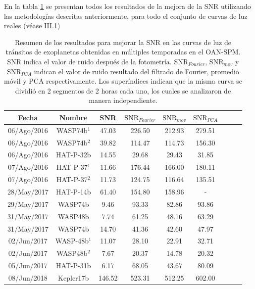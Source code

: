 En la tabla \ref{tab_resultados_obs} se presentan todos los resultados de la mejora de la SNR utilizando las metodologías descritas anteriormente, para todo el conjunto de curvas de luz reales (véase III.1)

\begin{table}
	\centering
	\begin{footnotesize}
	\begin{tabular}{ccccccccc}
	\hline 
	Fecha & Nombre & SNR & $\mbox{SNR}_{Fourier}$ &  $\mbox{SNR}_{mov}$ & $\mbox{SNR}_{PCA}$\\ 
	\hline
	06/Ago/2016 & WASP74b$^{1}$ & 47.03 & 226.50 & 212.93 & 279.51 \\ 
	06/Ago/2016 & WASP74b$^{2}$ & 39.82 & 114.47 & 114.73 & 156.30 \\
	06/Ago/2016 & HAT-P-32b & 14.55 & 29.68 & 29.43 & 31.85 \\
	07/Ago/2016 & HAT-P-37$^{1}$ & 11.66 & 176.44 & 166.00 & 180.11 \\ 
	07/Ago/2016 & HAT-P-37$^{2}$ & 11.73 & 124.75 & 116.64 & 135.51 \\ 
	28/May/2017 & HAT-P-14b & 61.40 & 154.80 & 158.96 & - \\ 
	29/May/2017 & WASP74b & 9.46 & 93.33 & 82.86 & 93.86 \\
	31/May/2017 & WASP48b & 7.74 & 61.25 & 48.16 & 63.29 \\  
	31/May/2017 & WASP74b & 14.70 & 41.36 & 42.60 & 47.97 \\
	02/Jun/2017 & WASP-48b$^{1}$ & 11.07 & 28.10 & 22.91 & 32.71 \\
	02/Jun/2017 & WASP48b$^{2}$ & 7.67 & 20.37 & 14.78 & 20.32 \\
	05/Jun/2017 & HAT-P-31b & 6.17 & 68.05 & 43.67 & 80.09 \\
	08/Jun/2018 & Kepler17b & 146.52 & 523.31 & 512.25 & 602.00 \\ 
	\hline 
	\end{tabular} 
	\end{footnotesize}
	\caption{Resumen de los resultados para mejorar la SNR en las curvas de luz de tránsitos de exoplanetas obtenidas en múltiples temporadas en el OAN-SPM. SNR indica el valor de ruido después de la fotometría. $\mbox{SNR}_{Fourier}$, $\mbox{SNR}_{mov}$ y $\mbox{SNR}_{PCA}$ indican el valor de ruido resultado del filtrado de Fourier, promedio móvil y PCA respectivamente. Los superíndices indican que la misma curva se dividió en 2 segmentos de 2 horas cada uno, los cuales se analizaron de manera independiente.}
	\label{tab_resultados_obs}
	\end{table}

